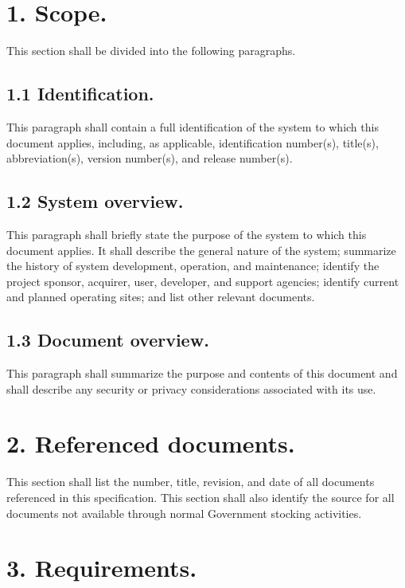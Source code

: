 \section{1. Scope.}

This section shall be divided into the following paragraphs.

\subsection{1.1 Identification.}

This paragraph shall contain a full identification of the system to
which this document applies, including, as applicable, identification
number(s), title(s), abbreviation(s), version number(s), and release
number(s).

\subsection{1.2 System overview.}

This paragraph shall briefly state the purpose of the system to which
this document applies. It shall describe the general nature of the
system; summarize the history of system development, operation, and
maintenance; identify the project sponsor, acquirer, user, developer,
and support agencies; identify current and planned operating sites; and
list other relevant documents.

\subsection{1.3 Document overview.}

This paragraph shall summarize the purpose and contents of this document
and shall describe any security or privacy considerations associated
with its use.

\section{2. Referenced documents.}

This section shall list the number, title, revision, and date of all
documents referenced in this specification. This section shall also
identify the source for all documents not available through normal
Government stocking activities.

\section{3. Requirements.}

